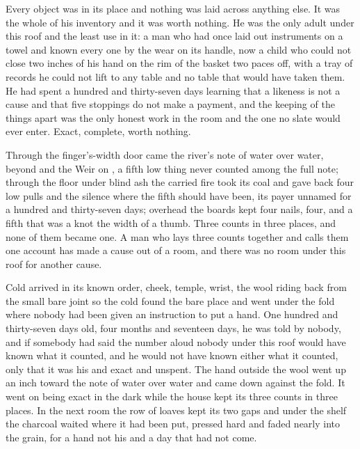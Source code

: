 Every object was in its place and nothing was laid across anything else. It was the whole of his inventory and it was worth nothing. He was the only adult under this roof and the least use in it: a man who had once laid out instruments on a towel and known every one by the wear on its handle, now a child who could not close two inches of his hand on the rim of the basket two paces off, with a tray of records he could not lift to any table and no table that would have taken them. He had spent a hundred and thirty-seven days learning that a likeness is not a cause and that five stoppings do not make a payment, and the keeping of the things apart was the only honest work in the room and the one no slate would ever enter. Exact, complete, worth nothing.

Through the finger's-width door came the river's note of water over water, beyond  and the Weir on , a fifth low thing never counted among the full note; through the floor under blind ash the carried fire took its coal and gave back four low pulls and the silence where the fifth should have been, its payer unnamed for a hundred and thirty-seven days; overhead the boards kept four nails, four, and a fifth that was a knot the width of a thumb. Three counts in three places, and none of them became one. A man who lays three counts together and calls them one account has made a cause out of a room, and there was no room under this roof for another cause.

Cold arrived in its known order, cheek, temple, wrist, the wool riding back from the small bare joint so the cold found the bare place and went under the fold where nobody had been given an instruction to put a hand. One hundred and thirty-seven days old, four months and seventeen days, he was told by nobody, and if somebody had said the number aloud nobody under this roof would have known what it counted, and he would not have known either what it counted, only that it was his and exact and unspent. The hand outside the wool went up an inch toward the note of water over water and came down against the fold. It went on being exact in the dark while the house kept its three counts in three places. In the next room the row of loaves kept its two gaps and under the shelf the charcoal waited where it had been put, pressed hard and faded nearly into the grain, for a hand not his and a day that had not come.
